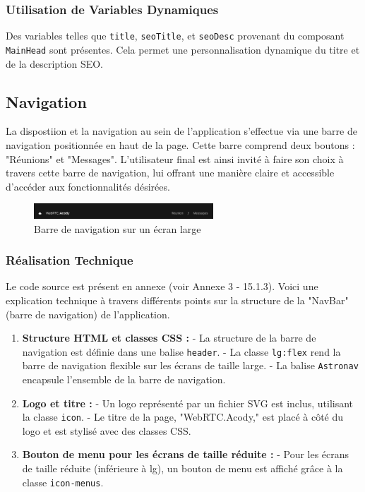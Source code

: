 \documentclass[12pt, a4paper, oneside]{thesis}
\begin{document}
\subsubsection{Utilisation de Variables Dynamiques}
Des variables telles que \texttt{title}, \texttt{seoTitle}, et \texttt{seoDesc} provenant du composant \texttt{MainHead} sont présentes. Cela permet une personnalisation dynamique du titre et de la description SEO.

\newpage
\subsection{Navigation}
La dispostiion et la navigation au sein de l'application s'effectue via une barre de navigation positionnée en haut de la page. Cette barre comprend deux boutons : "Réunions" et "Messages". L'utilisateur final est ainsi invité à faire son choix à travers cette barre de navigation, lui offrant une manière claire et accessible d'accéder aux fonctionnalités désirées.

\begin{figure}[h]
    \centering
    \includegraphics[width=0.6\textwidth]{images/NavBarPC.png}
    \caption{Barre de navigation sur un écran large}
\end{figure}

\subsubsection{Réalisation Technique}
Le code source est présent en annexe (voir Annexe 3 - 15.1.3). Voici une explication technique à travers différents points sur la structure de la "NavBar" (barre de navigation) de l'application.

\begin{enumerate}
    \item \textbf{Structure HTML et classes CSS :}
    - La structure de la barre de navigation est définie dans une balise \texttt{header}.
    - La classe \texttt{lg:flex} rend la barre de navigation flexible sur les écrans de taille large.
    - La balise \texttt{Astronav} encapsule l'ensemble de la barre de navigation.

    \item \textbf{Logo et titre :}
    - Un logo représenté par un fichier SVG est inclus, utilisant la classe \texttt{icon}.
    - Le titre de la page, "WebRTC.Acody," est placé à côté du logo et est stylisé avec des classes CSS.

    \item \textbf{Bouton de menu pour les écrans de taille réduite :}
    - Pour les écrans de taille réduite (inférieure à lg), un bouton de menu est affiché grâce à la classe \texttt{icon-menus}.

\end{enumerate}
\end{document}
